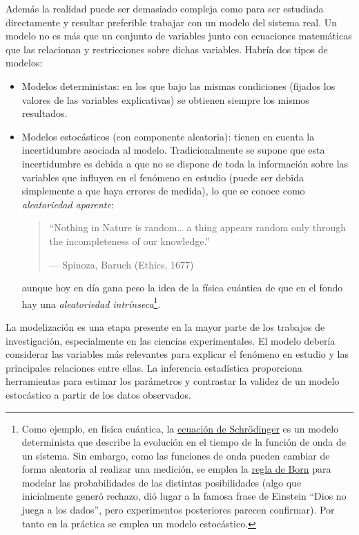 \documentclass[
]{book}
\theoremstyle{break}
\theoremstyle{nonumberplain}
\begin{document}
Además la realidad puede ser demasiado compleja como para ser estudiada directamente y resultar preferible trabajar con un modelo del sistema real.
Un modelo no es más que un conjunto de variables junto con ecuaciones matemáticas que las relacionan y restricciones sobre dichas variables.
Habría dos tipos de modelos:

\begin{itemize}
\item
  Modelos deterministas: en los que bajo las mismas condiciones (fijados los valores de las variables explicativas) se obtienen siempre los mismos resultados.
\item
  Modelos estocásticos (con componente aleatoria): tienen en cuenta la incertidumbre asociada al modelo. Tradicionalmente se supone que esta incertidumbre es debida a que no se dispone de toda la información sobre las variables que influyen en el fenómeno en estudio (puede ser debida simplemente a que haya errores de medida), lo que se conoce como \emph{aleatoriedad aparente}:

  \begin{quote}
  ``Nothing in Nature is random\ldots{} a thing appears random only through the incompleteness of our knowledge.''

  --- Spinoza, Baruch (Ethics, 1677)
  \end{quote}

  aunque hoy en día gana peso la idea de la física cuántica de que en el fondo hay una \emph{aleatoriedad intrínseca}\footnote{Como ejemplo, en física cuántica, la \href{https://es.wikipedia.org/wiki/Ecuaci\%C3\%B3n_de_Schr\%C3\%B6dinger}{ecuación de Schrödinger} es un modelo determinista que describe la evolución en el tiempo de la función de onda de un sistema. Sin embargo, como las funciones de onda pueden cambiar de forma aleatoria al realizar una medición, se emplea la \href{https://en.wikipedia.org/wiki/Born_rule}{regla de Born} para modelar las probabilidades de las distintas posibilidades (algo que inicialmente generó rechazo, dió lugar a la famosa frase de Einstein ``Dios no juega a los dados'', pero experimentos posteriores parecen confirmar). Por tanto en la práctica se emplea un modelo estocástico.}.
\end{itemize}

La modelización es una etapa presente en la mayor parte de los trabajos de investigación, especialmente en las ciencias experimentales.
El modelo debería considerar las variables más relevantes para explicar el fenómeno en estudio y las principales relaciones entre ellas.
La inferencia estadística proporciona herramientas para estimar los parámetros y contrastar la validez de un modelo estocástico a partir de los datos observados.
\end{document}

